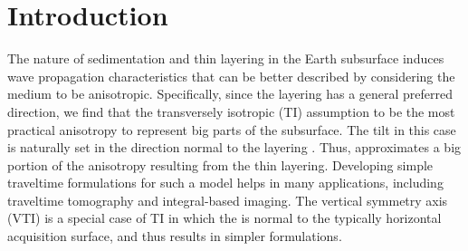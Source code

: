 \begin{abstract}
\end{abstract}

\newpage

\section{Introduction}

The nature of sedimentation and thin layering in the Earth subsurface induces wave propagation
characteristics that can be better described by considering the medium to be anisotropic. Specifically, since the layering has a general preferred direction, 
 we find that the transversely isotropic (TI) assumption to be the most practical 
anisotropy to represent big parts of the subsurface. The tilt in this case is naturally set in the direction normal to the layering
\cite[]{SEG-2000-09650968,audebert:P185,ttt,alkhalifah:A19}.
Thus,   approximates 
a big portion of the anisotropy resulting from the thin layering. Developing simple traveltime formulations
for such a model helps in many applications, including traveltime tomography and integral-based  imaging. 
The vertical symmetry axis (VTI)  is a special case of
TI in which the   is normal to the typically horizontal acquisition surface, and thus results in simpler formulations.

